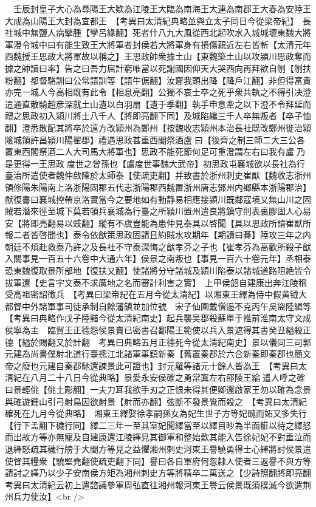 　壬辰封皇子大心為尋陽王大欵為江陵王大臨為南海王大連為南郡王大春為安陸王大成為山陽王大封為宜都王　【考異曰太清紀典略並與立太子同日今從梁帝紀】　長社城中無鹽人病攣腫【孿呂緣翻】死者什八九大風從西北起吹水入城城壞東魏大將軍澄令城中曰有能生致王大將軍者封侯若大將軍身有損傷親近左右皆斬【太清元年西魏授王思政大將軍故以稱之】王思政帥衆據土山【東魏築土山以攻潁川思政奪而據之帥讀曰率】告之曰吾力屈計窮唯當以死謝國因仰天大哭西向再拜欲自刎【刎扶粉翻】都督駱訓曰公常語訓等【語牛倨翻】汝齎我頭出降【降戶江翻】非但得富貴亦完一城人今高相既有此令【相息亮翻】公獨不哀士卒之死乎衆共執之不得引决澄遣通直散騎趙彦深就土山遺以白羽扇【遺于季翻】執手申意牽之以下澄不令拜延而禮之思政初入潁川將士八千人【將即亮翻下同】及城陷纔三千人卒無叛者【卒子恤翻】澄悉散配其將卒於遠方改潁州為鄭州【按魏收志潁州本治長社既改鄭州徙治潁隂城領許昌潁川陽翟郡】禮遇思政甚重西閣祭酒盧曰【後齊之制三師二大三公各置東西閣祭酒二人大司馬大將軍也】思政不能死節何足可重澄謂左右曰我有盧乃是更得一王思政度世之曾孫也【盧度世事魏大武帝】初思政屯襄城欲以長社為行臺治所遣使者魏仲啟陳於太師泰【使疏吏翻】并致書於浙州刺史崔猷【魏收志浙州領修陽朱陽南上洛浙陽固郡五代志浙陽郡西魏置浙州唐志鄧州内鄉縣本浙陽郡治】猷復書曰襄城控帶京洛實當今之要地如有動静易相應接潁川既鄰寇境又無山川之固賊若潛來徑至城下莫若頓兵襄城為行臺之所潁川置州遣良將鎮守則表裏膠固人心易安【將即亮翻易以豉翻】縱有不虞豈能為患仲見泰具以啓聞【具以思政所請崔猷所報二者皆啓聞也】泰令依猷策思政固請且約賊水攻期年【期讀曰朞】陸攻三年之内朝廷不煩赴救泰乃許之及長社不守泰深悔之猷孝芬之子也【崔孝芬為高歡所殺子猷入關事見一百五十六卷中大通六年】侯景之南叛也【事見一百六十卷元年】丞相泰恐東魏復取景所部地【復扶又翻】使諸將分守諸城及潁川陷泰以諸城道路阻絶皆令拔軍還【史言宇文泰不求廣地之名而審計利害之實】　上甲侯韶自建康出奔江陵稱受高祖密詔徵兵　【考異曰梁帝紀在五月今從太清紀】以湘東王繹為侍中假黄钺大都督中外諸軍事司徒承制自餘藩鎮並加位號　宋子仙圍戴僧逷不克丙午吳盜陸緝等　【考異曰典略作戊子陸黯今從太清紀南史】起兵襲吴郡殺蘇單于推前淮南太守文成侯寧為主　臨賀王正德怨侯景賣已密書召鄱陽王範使以兵入景遮得其書癸丑縊殺正德【縊於賜翻又於計翻　考異曰典略五月正德死今從太清紀南史】景以儀同三司郭元建為尚書僕射北道行臺摠江北諸軍事鎮新秦【舊置秦郡於六合新秦即秦郡也簡文帝之廢也元建自秦郡馳還諫景此可證也】封元羅等諸元十餘人皆為王　【考異曰太清紀在八月二十八日今從典略】景愛永安侯確之勇常寘左右邵陵王綸遣人呼之確曰景輕佻【佻土彫翻】一夫力耳我欲手刃之正恨未得其便卿還啟家王勿以確為念景與確遊鍾山引弓射鳥因欲射景【射而亦翻】弦斷不發景覺而殺之　【考異曰太清紀確死在九月今從典略】　湘東王繹娶徐孝嗣孫女為妃生世子方等妃醜而妬又多失行【行下孟翻下穢行同】繹二三年一至其室妃聞繹當至以繹目眇為半面糚以待之繹怒而出故方等亦無寵及自建康還江陵繹見其御軍和整始歎其能入告徐妃妃不對垂泣而退繹怒疏其穢行牓于大閤方等見之益懼湘州刺史河東王譽驍勇得士心繹將討侯景遣使督其糧衆【驍堅堯翻使疏吏翻下同】譽曰各自軍府何忽隸人使者三返譽不與方等請討之繹乃以少子安南侯方矩為湘州刺史方等將精卒二萬送之【少詩照翻將即亮翻考異曰太清紀云初上遣諮議參軍周弘直往湘州報河東王譽云侯景既須撲滅今欲遣荆州兵力使汝】<br />
